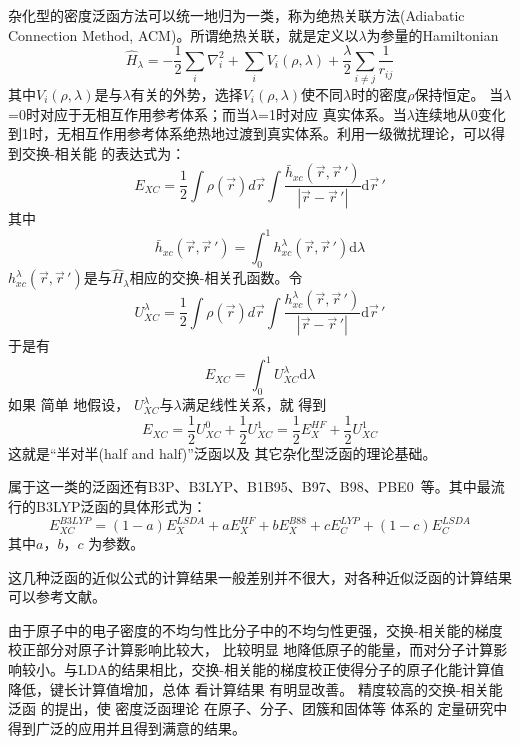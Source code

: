 杂化型的密度泛函方法可以统一地归为一类，称为绝热关联方法(Adiabatic Connection Method, ACM)。所谓绝热关联，就是定义以$\lambda$为参量的Hamiltonian
\begin{equation}
  \hat H_{\lambda}=-\dfrac12\sum_i\nabla_i^2+\sum_iV_i(\rho,\lambda)+\dfrac{\lambda}2\sum_{i\neq j}\dfrac1{r_{ij}}
  \label{eq:dft-27}
\end{equation}
其中$V_i(\rho,\lambda)$是与$\lambda$有关的外势，选择$V_i(\rho,\lambda)$使不同$\lambda$时的密度$\rho$保持恒定。%
当$\lambda$=0时对应于无相互作用参考体系；而当$\lambda$=1时对应%
真实体系。当$\lambda$连续地从0变化到1时，无相互作用参考体系绝热地过渡到真实体系。利用一级微扰理论\cite{JCP88-1053_1988}，可以得到交换-相关能%
{的}表达式为：
$$E_{XC}=\dfrac12\int\rho(\vec r)d\vec r\int\dfrac{\bar h_{xc}(\vec r,\vec r\,')}{|\vec r-\vec r\,'|}\textrm{d}\vec r\,'$$
其中$$\bar h_{xc}(\vec r,\vec r\,')=\int_0^1h_{xc}^{\lambda}(\vec r,\vec r\,')\textrm{d}\lambda$$
$h_{xc}^{\lambda}(\vec r,\vec r\,')$是与$\hat H_{\lambda}$相应的交换-相关孔函数。令
$$U_{XC}^{\lambda}=\dfrac12\int\rho(\vec r)d\vec r\int\dfrac{h_{xc}^{\lambda}(\vec r,\vec r\,')}{|\vec r-\vec r\,'|}\textrm{d}\vec r\,'$$
于是有$$E_{XC}=\int_0^1U_{XC}^{\lambda}\textrm{d}\lambda$$
如果%
简单%
{地}假设，%
$U_{XC}^{\lambda}$与$\lambda$满足线性关系，就%
得到
$$E_{XC}=\dfrac12U_{XC}^0+\dfrac12U_{XC}^1=\dfrac12E_X^{HF}+\dfrac12U_{XC}^1$$
这就是“半对半(half and half)”泛函以及%
{其它}杂化型泛函的理论基础。

属于这一类的泛函还有B3P\cite{JCP98-5648_1993}、B3LYP\cite{JPC98-11623_1994}、B1B95\cite{JCP104-1040_1995}、B97\cite{JCP107-8554_1997}、B98\cite{JCP109-2092_1998}、PBE0\cite{JCP110-6158_1999}~等。其中最流行的B3LYP泛函的具体形式为：
$$E_{XC}^{B3LYP}=(1-a)E_X^{LSDA}+aE_X^{HF}+bE_X^{B88}+cE_C^{LYP}+(1-c)E_C^{LSDA}$$
其中$a$，$b$，$c$%
为参数。

这几种泛函的近似公式的计算结果{一般}差别并不很大，对各种近似泛函的计算结果可以参考文献。

由于原子中的电子密度的不均匀性比分子中的不均匀性更强，交换-相关能的梯度校正部分对原子{计算}影响比较大，%
比较明显%
{地}降低原子的能量，而对分子{计算}影响较小{。}与LDA的结果相比，交换-相关能的梯度校正使得分子的原子化能{计算值}降低，键长{计算值}增加，总体%
{看计算}结果%
有明显改善。%
精度较高的交换-相关能泛函%
的提出，使%
密度泛函理论%
{在}原子、分子、团簇和固体等%
体系的%
{定量研究中得到广泛的应用并且得到满意的结果。}

